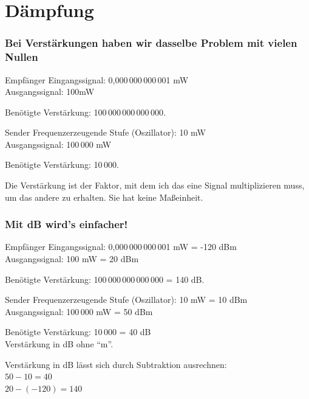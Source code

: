 \begin{frame}

\end{frame}

\section*{Dämpfung}

\begin{frame}
  \frametitle{Bei Verstärkungen haben wir dasselbe Problem mit vielen Nullen}

  \begin{block}{Empfänger}
    Eingangssignal: 0,000\,000\,000\,001 mW\\
    Ausgangssignal: 100mW

    Benötigte Verstärkung: 100\,000\,000\,000\,000.
  \end{block}

  \begin{block}{Sender}
    Frequenzerzeugende Stufe (Oszillator): 10 mW\\
    Ausgangssignal: 100\,000 mW

    Benötigte Verstärkung: 10\,000.
  \end{block}

  Die Verstärkung ist der Faktor, mit dem ich das eine Signal multiplizieren muss, um das andere zu erhalten. Sie hat keine Maßeinheit.
\end{frame}

\begin{frame}
  \frametitle{Mit dB wird's einfacher!}

  \begin{block}{Empfänger}
    Eingangssignal: 0,000\,000\,000\,001 mW = -120 dBm\\
    Ausgangssignal: 100 mW = 20 dBm

    Benötigte Verstärkung: 100\,000\,000\,000\,000 = 140 dB.
  \end{block}

  \begin{block}{Sender}
    Frequenzerzeugende Stufe (Oszillator): 10 mW = 10 dBm\\
    Ausgangssignal: 100\,000 mW = 50 dBm

    Benötigte Verstärkung: 10\,000 = 40 dB\\
    Verstärkung in dB ohne ``m''.
  \end{block}

  Verstärkung in dB lässt sich durch Subtraktion ausrechnen:\\
  $50 - 10 = 40$\\
  $20 - (-120) = 140$
\end{frame}

